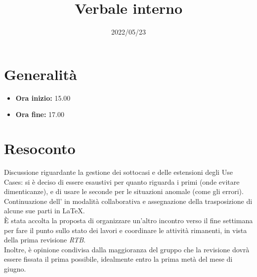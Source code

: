 \documentclass{classes/base}
\title{Verbale interno}
\date{2022/05/23}
\author{\marcov}
\renewcommand{\maketitle}{
    
}
\begin{document}
    \maketitle

    \section*{Generalità}
    \begin{itemize}
        \item \textbf{Ora inizio:} 15.00
        \item \textbf{Ora fine:} 17.00
    \end{itemize}
    

    \section*{Resoconto}
    Discussione riguardante la gestione dei sottocasi e delle estensioni degli Use Cases: si è deciso di essere esaustivi per quanto riguarda i primi (onde evitare dimenticanze), e di usare le seconde per le situazioni anomale (come gli errori). \\
    Continuazione dell'\AdR{} in modalità collaborativa e assegnazione della trasposizione di alcune sue parti in \LaTeX.\\
    È stata accolta la proposta di organizzare un'altro incontro verso il fine settimana per fare il punto sullo stato dei lavori e coordinare le attività rimanenti, in vista della prima revisione \textit{RTB}.\\
    Inoltre, è opinione condivisa dalla maggioranza del gruppo che la revisione dovrà essere fissata il prima possibile, idealmente entro la prima metà del mese di giugno.
\end{document}
